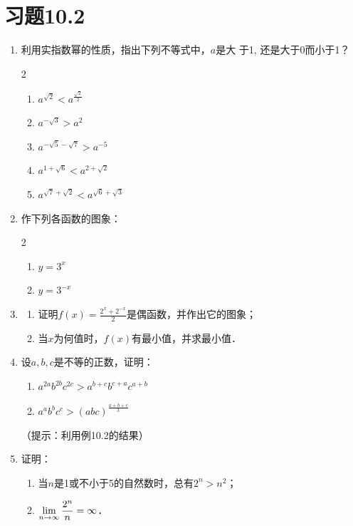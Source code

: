 \section*{习题10.2}
\begin{enumerate}
  \item 利用实指数幂的性质，指出下列不等式中，$a$是大
  于1, 还是大于0而小于1？
\begin{multicols}{2}
  \begin{enumerate}
  \item $a^{\sqrt{2}}<a^{\tfrac{\sqrt{2}}{2}}$
  \item $a^{-\sqrt{3}}>a^2$
  \item $a^{-\sqrt{5}-\sqrt{7}}>a^{-5}$
  \item $a^{1+\sqrt{6}}<a^{2+\sqrt{2}}$
  \item $a^{\sqrt{7}+\sqrt{2}}<a^{\sqrt{6}+\sqrt{3}}$
\end{enumerate}
\end{multicols}

\item 作下列各函数的图象：
\begin{multicols}{2}
  \begin{enumerate}
  \item $y=3^x$
  \item $y=3^{-x}$
\end{enumerate}
\end{multicols}

\item \begin{enumerate}
  \item 证明$f(x)=\frac{2^x+2^{-x}}{2}$是偶函数，并作出它的图象；
  \item 当$x$为何值时，$f(x)$有最小值，并求最小值．
\end{enumerate}

\item 设$a,b,c$是不等的正数，证明：
\begin{enumerate}
  \item $a^{2 a} b^{2 b} c^{2 c}>a^{b+c} b^{c+a} c^{a+b}$
  \item $a^{a} b^{b} c^{c}>(a b c)^{\tfrac{a+b+c}{3}}$
\end{enumerate}
（提示：利用例10.2的结果）

\item 证明：
\begin{enumerate}
  \item 当$n$是1或不小于5的自然数时，总有$2^n>n^2$；
  \item $\displaystyle\lim_{n\to\infty}\dfrac{2^n}{n}=\infty$．
\end{enumerate}
\end{enumerate}

